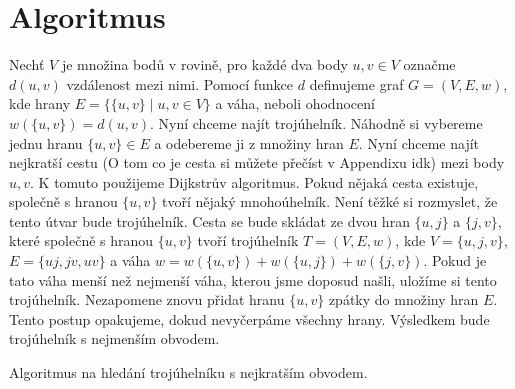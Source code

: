 \section{Algoritmus}
\label{sec:algoritmus}

Nechť $V$ je množina bodů v rovině, pro každé dva body $u, v \in V$ označme $d(u, v)$ vzdálenost mezi nimi. Pomocí funkce $d$ definujeme graf $G = (V, E, w)$, kde hrany $E = \{\{u, v\} \mid u, v \in V\}$ a váha, neboli ohodnocení $w(\{u, v\}) = d(u, v)$. Nyní chceme najít trojúhelník. Náhodně si vybereme jednu hranu $\{u, v\} \in E$ a odebereme ji z množiny hran $E$. Nyní chceme najít nejkratší cestu (O tom co je cesta si můžete přečíst v Appendixu idk) mezi body $u, v$. K tomuto použijeme Dijkstrův algoritmus. Pokud nějaká cesta existuje, společně s hranou $\{u, v\}$ tvoří nějaký mnohoúhelník. Není těžké si rozmyslet, že tento útvar bude trojúhelník. Cesta se bude skládat ze dvou hran $\{u, j\}$ a $\{j, v\}$, které společně s hranou $\{u, v\}$ tvoří trojúhelník $T = (V, E, w)$, kde $V = \{u, j, v\}$, $E = \{uj, jv, uv\}$ a váha $w = w(\{u, v\}) + w(\{u, j\}) + w(\{j, v\})$. Pokud je tato váha menší než nejmenší váha, kterou jsme doposud našli, uložíme si tento trojúhelník. Nezapomene znovu přidat hranu $\{u, v\}$ zpátky do množiny hran $E$. Tento postup opakujeme, dokud nevyčerpáme všechny hrany. Výsledkem bude trojúhelník s nejmenším obvodem.



\begin{algorithm}
    \caption{Algoritmus na hledání trojúhelníku s nejkratším obvodem.}
    \label{alg:algoritmus}
   
   
    \BlankLine
    \;
   \end{algorithm}